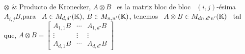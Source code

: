 \begin{notation}
\cite{HorJoh13, MagNeu99}\\[2.5mm]
\hline
%
$\otimes$ & Producto de Kronecker, $A \otimes B$ \ es la matriz bloc de bloc \
$(i,j)$-\'esima \ $A_{i,j} B$,\vspace{1mm}\newline para \ $A \in
M_{d,d'}(\mathbb{K}), \: B \in M_{n,n'}(\mathbb{K})$, tenemos \ $A \otimes B \in M_{d n,
d' n'}(\mathbb{K})$ \ tal que,\vspace{1mm}\newline
%
$
A \otimes B = \begin{bmatrix}
A_{1,1} B  & \cdots  & A_{1,d'} B\\
 \vdots   &  \vdots & \vdots\\
A_{d,1} B  & \cdots  & A_{d,d'} B
\end{bmatrix}
$\vspace{1mm}
%
\end{notation}